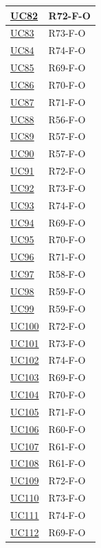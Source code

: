 \begin{longtable}{|p{2.8cm}|p{10.2cm}|}
	\hyperlink{uc82}{UC82}   & R72-F-O \\ \hline
	\hyperlink{uc83}{UC83}   & R73-F-O \\ \hline
	\hyperlink{uc84}{UC84}   & R74-F-O \\ \hline
	\hyperlink{uc85}{UC85}   & R69-F-O \\ \hline
	\hyperlink{uc86}{UC86}   & R70-F-O \\ \hline
	\hyperlink{uc87}{UC87}   & R71-F-O \\ \hline
	\hyperlink{uc88}{UC88}   & R56-F-O \\ \hline
	\hyperlink{uc89}{UC89}   & R57-F-O \\ \hline
	\hyperlink{uc90}{UC90}   & R57-F-O \\ \hline
	\hyperlink{uc91}{UC91}   & R72-F-O \\ \hline
	\hyperlink{uc92}{UC92}   & R73-F-O \\ \hline
	\hyperlink{uc93}{UC93}   & R74-F-O \\ \hline
	\hyperlink{uc94}{UC94}   & R69-F-O \\ \hline
	\hyperlink{uc95}{UC95}   & R70-F-O \\ \hline
	\hyperlink{uc96}{UC96}   & R71-F-O \\ \hline
	\hyperlink{uc97}{UC97}   & R58-F-O \\ \hline
	\hyperlink{uc98}{UC98}   & R59-F-O \\ \hline
	\hyperlink{uc99}{UC99}   & R59-F-O \\ \hline
	\hyperlink{uc100}{UC100} & R72-F-O \\ \hline
	\hyperlink{uc101}{UC101} & R73-F-O \\ \hline
	\hyperlink{uc102}{UC102} & R74-F-O \\ \hline
	\hyperlink{uc103}{UC103} & R69-F-O \\ \hline
	\hyperlink{uc104}{UC104} & R70-F-O \\ \hline
	\hyperlink{uc105}{UC105} & R71-F-O \\ \hline
	\hyperlink{uc106}{UC106} & R60-F-O \\ \hline
	\hyperlink{uc107}{UC107} & R61-F-O \\ \hline
	\hyperlink{uc108}{UC108} & R61-F-O \\ \hline
	\hyperlink{uc109}{UC109} & R72-F-O \\ \hline
	\hyperlink{uc110}{UC110} & R73-F-O \\ \hline
	\hyperlink{uc111}{UC111} & R74-F-O \\ \hline
	\hyperlink{uc112}{UC112} & R69-F-O \\ \hline

\end{longtable}

